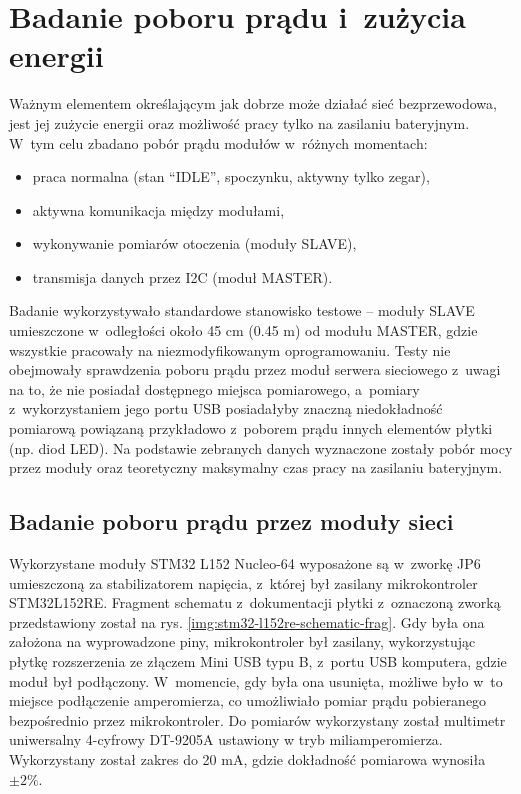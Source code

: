 \FloatBarrier
\section{\label{sect:network-power-params}Badanie poboru prądu i~zużycia energii} Ważnym elementem określającym jak
dobrze może działać sieć bezprzewodowa, jest jej zużycie energii oraz możliwość pracy tylko na zasilaniu bateryjnym.
W~tym celu zbadano pobór prądu modułów w~różnych momentach:
\begin{itemize}[label=--]
    \item praca normalna (stan \enquote{IDLE}, spoczynku, aktywny tylko zegar),
    \item aktywna komunikacja między modułami,
    \item wykonywanie pomiarów otoczenia (moduły SLAVE),
    \item transmisja danych przez I2C (moduł MASTER).
\end{itemize}

Badanie wykorzystywało standardowe stanowisko testowe -- moduły SLAVE umieszczone w~odległości około 45 cm (0.45 m) od
modułu MASTER, gdzie wszystkie pracowały na niezmodyfikowanym oprogramowaniu. Testy nie obejmowały sprawdzenia poboru
prądu przez moduł serwera sieciowego z~uwagi na to, że nie posiadał dostępnego miejsca pomiarowego, a~pomiary
z~wykorzystaniem jego portu USB posiadałyby znaczną niedokładność pomiarową powiązaną przykładowo z~poborem prądu innych
elementów płytki (np. diod LED). Na podstawie zebranych danych wyznaczone zostały pobór mocy przez moduły oraz
teoretyczny maksymalny czas pracy na zasilaniu bateryjnym.

\subsection{\label{sect:network-modules-current-draw}Badanie poboru prądu przez moduły sieci} Wykorzystane moduły STM32
L152 Nucleo-64 wyposażone są w~zworkę JP6 umieszczoną za stabilizatorem napięcia, z~której był zasilany mikrokontroler
STM32L152RE. Fragment schematu z~dokumentacji płytki \cite{stm-product-overview} z~oznaczoną zworką przedstawiony został
na rys. \ref{img:stm32-l152re-schematic-frag}. Gdy była ona założona na wyprowadzone piny, mikrokontroler był zasilany,
wykorzystując płytkę rozszerzenia ze złączem Mini USB typu B, z~portu USB komputera, gdzie moduł był podłączony.
W~momencie, gdy była ona usunięta, możliwe było w~to miejsce podłączenie amperomierza, co umożliwiało pomiar prądu
pobieranego bezpośrednio przez mikrokontroler. Do pomiarów wykorzystany został multimetr uniwersalny 4-cyfrowy DT-9205A
ustawiony w tryb miliamperomierza. Wykorzystany został zakres do 20 mA, gdzie dokładność pomiarowa wynosiła $\pm 2\%$.

